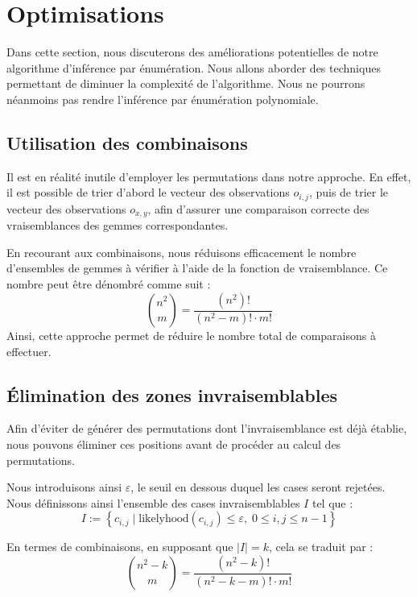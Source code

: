 \documentclass{article}
\begin{document}
\section{Optimisations}

\noindent Dans cette section, nous discuterons des améliorations potentielles de notre algorithme d'inférence par énumération. Nous allons aborder des techniques permettant de diminuer la complexité de l'algorithme. Nous ne pourrons néanmoins pas rendre l'inférence par énumération polynomiale.

\subsection{Utilisation des combinaisons}

\noindent Il est en réalité inutile d'employer les permutations dans notre approche. En effet, il est possible de trier d'abord le vecteur des observations \( o_{i,j} \), puis de trier le vecteur des observations \( o_{x,y} \), afin d'assurer une comparaison correcte des vraisemblances des gemmes correspondantes.

\vspace{1em}

\noindent En recourant aux combinaisons, nous réduisons efficacement le nombre d'ensembles de gemmes à vérifier à l'aide de la fonction de vraisemblance. Ce nombre peut être dénombré comme suit :
\[
\binom{n^2}{m} = \frac{(n^2)!}{(n^2 - m)! \cdot m!}
\]
Ainsi, cette approche permet de réduire le nombre total de comparaisons à effectuer.

\subsection{Élimination des zones invraisemblables}

\noindent Afin d'éviter de générer des permutations dont l'invraisemblance est déjà établie, nous pouvons éliminer ces positions avant de procéder au calcul des permutations.

\vspace{1em}

\noindent Nous introduisons ainsi \( \varepsilon \), le seuil en dessous duquel les cases seront rejetées. Nous définissons ainsi l'ensemble des cases invraisemblables \( I \) tel que :
\[
I := \left\{ c_{i,j} \;|\; \text{likelyhood}(c_{i,j}) \leq \varepsilon, \; 0 \leq i, j \leq n-1 \right\}
\]

\noindent En termes de combinaisons, en supposant que \( |I| = k \), cela se traduit par :
\[
\binom{n^2 - k}{m} = \frac{(n^2 - k)!}{(n^2 - k - m)! \cdot m!}
\]
\end{document}
